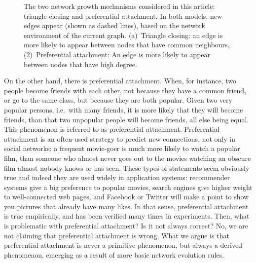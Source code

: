 \documentclass{jimis}
\begin{document}
\begin{figure}
  \centering
  \caption{
    \label{fig:illustration}
    The two network growth mechanisms considered in this article:
    triangle closing and preferential attachment.  In both models, new
    edges appear (shown as dashed lines), based on the network
    environment of the current graph. (a)~Triangle closing:  an edge
    is more likely to appear between nodes that have common neighbours,
    (2)~Preferential attachment:  An edge is more likely to appear
    between nodes that have high degree. 
  }
\end{figure}

On the other hand, there is preferential attachment.  When, for
instance, two people become friends with each other, not because they
have a common friend, or go to the same class, but because they are both
popular.  Given two very popular persons, i.e.\ with many friends, it is
more likely that they will become friends, than that two unpopular
people will become friends, all else being equal.  This phenomenon is
referred to as preferential attachment.  Preferential attachment is an
often-used strategy to predict new connections, not only in social
networks: a frequent movie-goer is much more likely to watch a popular
film, than someone who almost never goes out to the movies watching an
obscure film almost nobody knows or has seen.  These types of statements
seem obviously true and indeed they are used widely in application
systems: recommender systems give a big preference to popular movies,
search engines give higher weight to well-connected web pages, and
Facebook or Twitter will make a point to show you pictures that already have many
likes.  In that sense, preferential attachment is true empirically, and
has been verified many times in experiments.  Then, what is problematic with
preferential attachment?  Is it not always correct?  No, we are not
claiming that preferential attachment is wrong.  What we argue is that
preferential attachment is never a primitive phenomenon, but always a
derived phenomenon, emerging as a result of more basic network evolution
rules.
\end{document}
